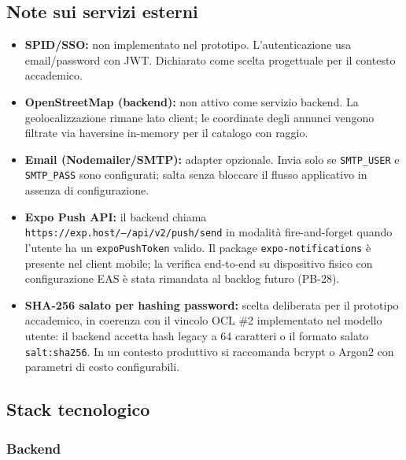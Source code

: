 \documentclass[11pt,a4paper]{article}
\newcommand{\code}[1]{\texttt{#1}}
\begin{document}
\subsection{Note sui servizi esterni}

\begin{itemize}[noitemsep]
  \item \textbf{SPID/SSO:} non implementato nel prototipo. L'autenticazione usa email/password con JWT. Dichiarato come scelta progettuale per il contesto accademico.
  \item \textbf{OpenStreetMap (backend):} non attivo come servizio backend. La geolocalizzazione rimane lato client; le coordinate degli annunci vengono filtrate via haversine in-memory per il catalogo con raggio.
  \item \textbf{Email (Nodemailer/SMTP):} adapter opzionale. Invia solo se \code{SMTP\_USER} e \code{SMTP\_PASS} sono configurati; salta senza bloccare il flusso applicativo in assenza di configurazione.
  \item \textbf{Expo Push API:} il backend chiama \code{https://exp.host/--/api/v2/push/send} in modalità fire-and-forget quando l'utente ha un \code{expoPushToken} valido. Il package \code{expo-notifications} è presente nel client mobile; la verifica end-to-end su dispositivo fisico con configurazione EAS è stata rimandata al backlog futuro (PB-28).
  \item \textbf{SHA-256 salato per hashing password:} scelta deliberata per il prototipo accademico, in coerenza con il vincolo OCL \#2 implementato nel modello utente: il backend accetta hash legacy a 64 caratteri o il formato salato \code{salt:sha256}. In un contesto produttivo si raccomanda bcrypt o Argon2 con parametri di costo configurabili.
\end{itemize}

\subsection{Stack tecnologico}

\subsubsection*{Backend}
\end{document}
